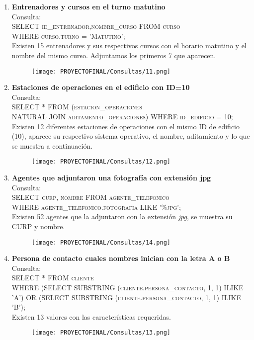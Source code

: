 \documentclass[12pt,letterpaper]{article}
\begin{document}
\begin{enumerate}
    \newpage
    \item \textbf{Entrenadores y cursos en el turno matutino} \\
   Consulta:\\  \textsc{ SELECT id\_entrenador,nombre\_curso FROM curso\\ WHERE curso.turno = 'Matutino';}\\
    Existen 15 entrenadores y sus respectivos cursos con el horario matutino y el nombre del mismo curso. Adjuntamos los primeros 7 que aparecen. 
    \begin{figure}[h]
        \centering
        \texttt{[image: PROYECTOFINAL/Consultas/11.png]}
    \end{figure}

    
    \item \textbf{Estaciones de operaciones en el edificio con ID=10} \\
    Consulta:\\ \textsc{ SELECT * FROM (estacion\_operaciones\\ NATURAL JOIN aditamento\_operaciones) WHERE id\_edificio = 10;}\\
     Existen 12 diferentes estaciones de operaciones con el mismo ID de edificio (10), aparece su respectivo sistema operativo, el nombre, aditamiento y lo que se muestra a continuación.
     \begin{figure}[h]
         \centering
         \texttt{[image: PROYECTOFINAL/Consultas/12.png]}
     \end{figure}
      \item \textbf{Agentes que adjuntaron una fotografía con extensión jpg} \\
   Consulta:\\ \textsc{SELECT curp, nombre FROM agente\_telefonico\\ WHERE agente\_telefonico.fotografia LIKE '\%jpg';}\\
    Existen 52 agentes que la adjuntaron  con la extensión \textit{jpg}, se muestra su CURP y  nombre.
     \begin{figure}[h]
         \centering
         \texttt{[image: PROYECTOFINAL/Consultas/14.png]}
     \end{figure}
   \newpage 
    \item \textbf{Persona de contacto cuales nombres inician con la letra A o B} \\
Consulta:\\ \textsc{ SELECT * FROM cliente\\ WHERE (SELECT SUBSTRING (cliente.persona\_contacto, 1, 1) ILIKE 'A') OR (SELECT SUBSTRING (cliente.persona\_contacto, 1, 1) ILIKE 'B');} \\Existen 13 valores con las características requeridas.
     \begin{figure}[h]
         \centering
         \texttt{[image: PROYECTOFINAL/Consultas/13.png]}
     \end{figure}
    

\end{enumerate}
\end{document}
